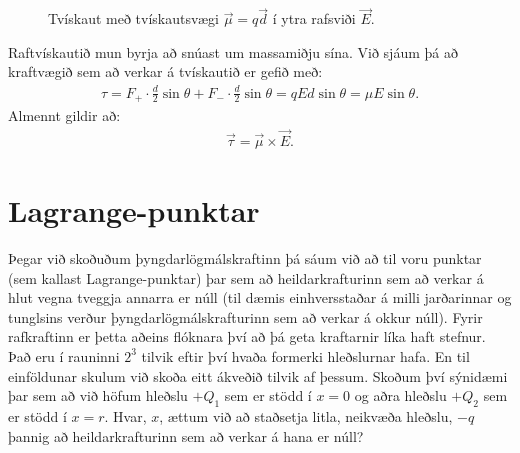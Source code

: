\begin{figure}[H]
    \centering
{}
    \caption{Tvískaut með tvískautsvægi $\vec{\mu} = q\vec{d}$ í ytra rafsviði $\vec{E}$.}
\end{figure}
Raftvískautið mun byrja að snúast um massamiðju sína. Við sjáum þá að kraftvægið sem að verkar á tvískautið er gefið með:
\begin{align*}
    \tau = F_+ \cdot \frac{d}{2}\sin\theta + F_- \cdot \frac{d}{2}\sin\theta = qEd\sin\theta = \mu E\sin\theta.
\end{align*}
Almennt gildir að:
\begin{align*}
    \vec{\tau} = \vec{\mu} \times \vec{E}.
\end{align*}

\section{Lagrange-punktar}

Þegar við skoðuðum þyngdarlögmálskraftinn þá sáum við að til voru punktar (sem kallast Lagrange-punktar) þar sem að heildarkrafturinn sem að verkar á hlut vegna tveggja annarra er núll (til dæmis einhversstaðar á milli jarðarinnar og tunglsins verður þyngdarlögmálskrafturinn sem að verkar á okkur núll). Fyrir rafkraftinn er þetta aðeins flóknara því að þá geta kraftarnir líka haft stefnur. Það eru í rauninni $2^3$ tilvik eftir því hvaða formerki hleðslurnar hafa. En til einföldunar skulum við skoða eitt ákveðið tilvik af þessum. Skoðum því sýnidæmi þar sem að við höfum hleðslu $+Q_1$ sem er stödd í $x = 0$ og aðra hleðslu $+Q_2$ sem er stödd í $x = r$. Hvar, $x$, ættum við að staðsetja litla, neikvæða hleðslu, $-q$ þannig að heildarkrafturinn sem að verkar á hana er núll?


